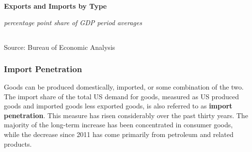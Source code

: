 \documentclass{report}
\begin{document}
{\begin{minipage}{0.76\textwidth}
\normalsize \textbf{Exports and Imports by Type}\\
\footnotesize{\textit{percentage point share of GDP \hspace{40mm} period averages}\\ 
 \setlength{\tabcolsep}{3.1pt} \color{black!90}
	{\renewcommand{\arraystretch}{1.55}
		\begin{tabular}{p{42mm} R{7.1mm} R{7.1mm} R{7.1mm} R{7.1mm} R{7.1mm} 
		   R{7.1mm} R{7.1mm} R{7.1mm} }
			  \hline
		\end{tabular}}\vspace{-2mm}
		
\footnotesize{Source: Bureau of Economic Analysis}}
\end{minipage}
\newpage
\begin{minipage}{0.76\textwidth}
\subsubsection*{Import Penetration}
\small Goods can be produced domestically, imported, or some combination of the two. The import share of the total US demand for goods, measured as US produced goods and imported goods less exported goods, is also referred to as \textbf{import penetration}. This measure has risen considerably over the past thirty years. The majority of the long-term increase has been concentrated in consumer goods, while the decrease since 2011 has come primarily from petroleum and related products. 

 



\vspace{3mm}


\end{minipage}}
\end{document}
